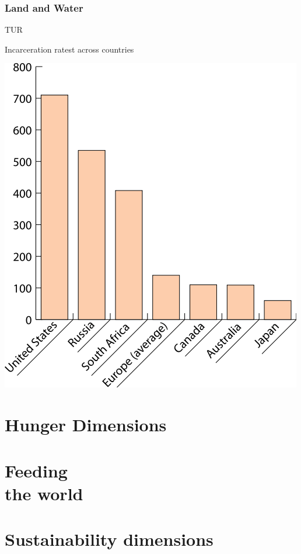 \documentclass[print,Draft]{faosyb}
\begin{document}
\clearspread
\section{Land and Water}

\lipsum[1-4]

\begin{chart}{T}{UR}
\caption{Incarceration ratest across countries}
\label{chart:incarceration}
\includegraphics[width=\chartwidth,height=\chartheight]{incarceration}  
\end{chart}

\begin{tablepages}
\small
  
\clearpage

\clearpage

\clearpage

\end{tablepages}


\part{Hunger Dimensions}
\lipsum
\EndPartIntro

\begin{tablepages}
\small
  

\end{tablepages}

\part[Feeding the world]{Feeding\\ the world}
\lipsum
\EndPartIntro

\part[Sustainability dimensions]{Sustain\-ability dimensions}
\lipsum
\EndPartIntro
\end{document}
